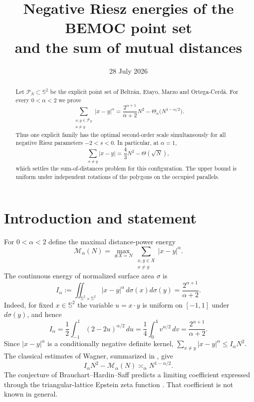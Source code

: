\documentclass[11pt]{amsart}
\title{Negative Riesz energies of the BEMOC point set\\
and the sum of mutual distances}
\author{}
\date{28 July 2026}
\newcommand{\Sph}{\mathbb S^2}
\newcommand{\cP}{\mathcal P}
\begin{document}
\begin{abstract}
Let $\cP_N\subset\mathbb S^2$ be the explicit point set of Beltr\'an,
Etayo, Marzo and Ortega-Cerd\`a.  For every $0<\alpha<2$ we prove
\[
 \sum_{\substack{x,y\in\cP_N\\x\ne y}}|x-y|^\alpha
 =\frac{2^{\alpha+1}}{\alpha+2}N^2
   -\Theta_\alpha\bigl(N^{1-\alpha/2}\bigr).
\]
Thus one explicit family has the optimal second-order scale simultaneously
for all negative Riesz parameters $-2<s<0$.  In particular, at $\alpha=1$,
\[
 \sum_{x\ne y}|x-y|=\frac43N^2-\Theta(\sqrt N),
\]
which settles the sum-of-distances problem for this configuration.  The
upper bound is uniform under independent rotations of the polygons on the
occupied parallels.
\end{abstract}
\maketitle

\section{Introduction and statement}

For $0<\alpha<2$ define the maximal distance-power energy
\[
 \mathcal M_\alpha(N)=\max_{\#X=N}
 \sum_{\substack{x,y\in X\\x\ne y}}|x-y|^\alpha.
\]
The continuous energy of normalized surface area $\sigma$ is
\begin{equation}\label{eq:continuous}
 I_\alpha:=\iint_{\Sph\times\Sph}|x-y|^\alpha
 \,d\sigma(x)d\sigma(y)=\frac{2^{\alpha+1}}{\alpha+2}. \tag{1.1}
\end{equation}
Indeed, for fixed $x\in\Sph$ the variable $u=x\cdot y$ is uniform on
$[-1,1]$ under $d\sigma(y)$, and hence
\[
 I_\alpha=\frac12\int_{-1}^1(2-2u)^{\alpha/2}\,du
 =\frac14\int_0^4v^{\alpha/2}\,dv
 =\frac{2^{\alpha+1}}{\alpha+2}.
\]
Since $|x-y|^\alpha$ is a conditionally negative definite kernel,
$\sum_{x\ne y}|x-y|^\alpha\le I_\alpha N^2$.  The classical estimates of
Wagner, summarized in \cite[Theorem~3.6]{HMS}, give
\begin{equation}\label{eq:optimalorder}
 I_\alpha N^2-\mathcal M_\alpha(N)\asymp_\alpha
 N^{1-\alpha/2}.                                     \tag{1.2}
\end{equation}
The conjecture of Brauchart--Hardin--Saff predicts a limiting coefficient
expressed through the triangular-lattice Epstein zeta function
\cite{BHS}.  That coefficient is not known in general.
\end{document}
